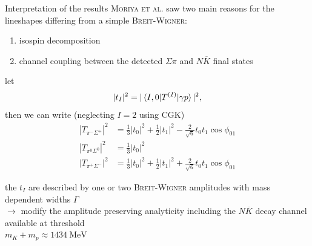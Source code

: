 \documentclass[11pt,aspectratio=1610,dvipsnames]{beamer}
\begin{document}
\begin{frame}{Interpretation of the results}
	\textsc{Moriya et al.} saw two main reasons for the lineshapes differing from a simple \textsc{Breit-Wigner}:
	\begin{enumerate}
		\item isospin decomposition
		\item channel coupling between the detected $\Sigma\pi$ and $N\overline{K}$ final states
	\end{enumerate}
\begin{minipage}{.56\linewidth}
	\begin{tcolorbox}[colback=black!10,colframe=gray!20!black,title=Isospin decomposition] 
		let $$|t_I|^2=|\braket{I,0|T^{(I)}|\gamma p}|^2,$$
		then we can write (neglecting $I=2$ using CGK)
		\vspace{-0.5cm}
		\begin{align*}
			|T_{\pi^-\Sigma^+}|^2&=\frac{1}{3}|t_0|^2+\frac{1}{2}|t_1|^2-\frac{2}{\sqrt{6}}t_0t_1\cos\phi_{01}\\
			|T_{\pi^0\Sigma^0}|^2&=\frac{1}{3}|t_0|^2\\
			|T_{\pi^+\Sigma^-}|^2&=\frac{1}{3}|t_0|^2+\frac{1}{2}|t_1|^2+\frac{2}{\sqrt{6}}t_0t_1\cos\phi_{01}
		\end{align*}
	\end{tcolorbox}
\end{minipage}
\begin{minipage}{.43\linewidth}
	\begin{tcolorbox}[colback=black!10,colframe=gray!20!black,title=Channel coupling]
		the $t_I$ are described by one or two \textsc{Breit-Wigner} amplitudes with mass dependent widths $\Gamma$ \\
		$\to$ modify the amplitude preserving analyticity \citet{flatte} including the $N\overline{K}$ decay channel available at threshold\\ $m_K+m_p\approx\SI{1434}{\mega\eV}$

	\end{tcolorbox}
\end{minipage}

\end{frame}
\end{document}
